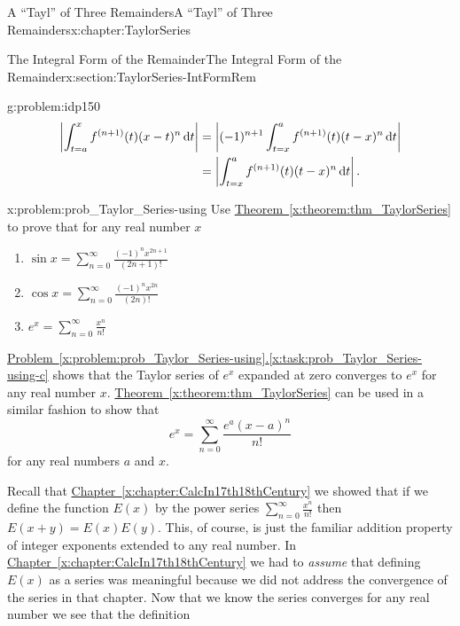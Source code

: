 \begin{chapterptx}{A ``Tayl'' of Three Remainders}{}{A ``Tayl'' of Three Remainders}{}{}{x:chapter:TaylorSeries}
\begin{sectionptx}{The Integral Form of the Remainder}{}{The Integral Form of the Remainder}{}{}{x:section:TaylorSeries-IntFormRem}
\begin{problem}{}{g:problem:idp150}
			\begin{align*}
				\left|\int_{t=a}^xf^{(n+1)}(t)(x-t)^n\,{\rm d} t\right|& =\left|(-1)^{n+1}\int_{t=x}^af^{(n+1)}(t)(t-x)^n\,{\rm d} t\right|\\
				& =\left|\int_{t=x}^af^{(n+1)}(t)(t-x)^n\,{\rm d} t\right|.
			\end{align*}
		\end{problem}
		\begin{problem}{}{x:problem:prob_Taylor_Series-using}%
			Use \hyperref[x:theorem:thm_TaylorSeries]{Theorem~{\xreffont\ref{x:theorem:thm_TaylorSeries}}} to prove that for any real number \(x\)%
			\begin{enumerate}[font=\bfseries,label=(\alph*),ref=\alph*]
				\item{}\(\displaystyle\sin x=\sum_{n=0}^\infty\frac{(-1)^nx^{2n+1}}{(2n+1)!}\)%
				\item{}\(\displaystyle\cos x= \sum_{n=0}^\infty\frac{(-1)^nx^{2n}}{(2n)!}\)%
				\item\label{x:task:prob_Taylor_Series-using-c}\(\displaystyle e^x=\sum_{n=0}^\infty\frac{x^n}{n!}\)%
			\end{enumerate}
		\end{problem}
		\hyperref[x:task:prob_Taylor_Series-using-c]{Problem~{\xreffont\ref{x:problem:prob_Taylor_Series-using}}.{\xreffont\ref{x:task:prob_Taylor_Series-using-c}}} shows that the Taylor series of \(e^x\) expanded at zero converges to \(e^x\) for any real number \(x\). \hyperref[x:theorem:thm_TaylorSeries]{Theorem~{\xreffont\ref{x:theorem:thm_TaylorSeries}}} can be used in a similar fashion to show that%
		\begin{equation*}
			e^x=\sum_{n=0}^\infty\frac{e^a(x-a)^n}{n!}
		\end{equation*}
		for any real numbers \(a\) and \(x\).%
		\par
		Recall that \hyperref[x:chapter:CalcIn17th18thCentury]{Chapter~{\xreffont\ref{x:chapter:CalcIn17th18thCentury}}} we showed that if we define the function \(E(x)\) by the power series \(\sum_{n=0}^\infty\frac{x^n}{n!}\) then \(E(x+y)=E(x)E(y)\). This, of course, is just the familiar addition property of integer exponents extended to any real number. In \hyperref[x:chapter:CalcIn17th18thCentury]{Chapter~{\xreffont\ref{x:chapter:CalcIn17th18thCentury}}} we had to \emph{assume} that defining \(E(x)\) as a series was meaningful because we did not address the convergence of the series in that chapter. Now that we know the series converges for any real number we see that the definition%
		\begin{equation*}

\end{equation*}
\end{sectionptx}
\end{chapterptx}
